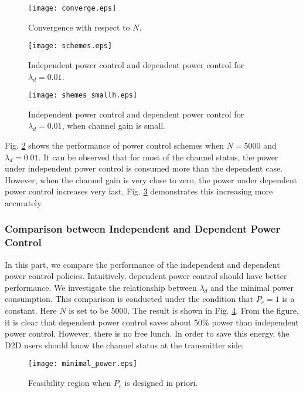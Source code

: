 \documentclass[12pt, draftclsnofoot, journal, letterpaper, onecolumn]{IEEEtran}
\begin{document}
\begin{figure}
\center
\texttt{[image: converge.eps]}
\center\caption{Convergence with respect to $N$.}\label{convergencefig}
\end{figure}

\begin{figure}
\center
\texttt{[image: schemes.eps]}
\center\caption{Independent power control and dependent power control for $\lambda_d=0.01$.}\label{pcschemes}
\end{figure}

\begin{figure}
\center
\texttt{[image: shemes\_smallh.eps]}
\center\caption{Independent power control and dependent power control for $\lambda_d=0.01$, when channel gain is small.}\label{pcschemessmallh}
\end{figure}

Fig. \ref{pcschemes} shows the performance of power control schemes when $N=5000$ and $\lambda_d=0.01$. It can be observed that for most of the channel status, the power under independent power control is consumed more than the dependent case. However, when the channel gain is very close to zero, the power under dependent power control increases very fast. Fig. \ref{pcschemessmallh} demonstrates this increasing more accurately.

\subsubsection{Comparison between Independent and Dependent Power Control}

In this part, we compare the performance of the independent and dependent power control policies. Intuitively, dependent power control should have better performance. We investigate the relationship between $\lambda_d$ and the minimal power consumption. This comparison is conducted under the condition that $P_c=1$ is a constant. Here $N$ is set to be $5000$. The result is shown in Fig. \ref{powercompare}. From the figure, it is clear that dependent power control saves about 50\% power than independent power control. However, there is no free lunch. In order to save this energy, the D2D users should know the channel status at the transmitter side.

\begin{figure}
\center
\texttt{[image: minimal\_power.eps]}
\center\caption{Feasibility region when $P_c$ is designed in priori.}\label{powercompare}
\end{figure}
\end{document}
